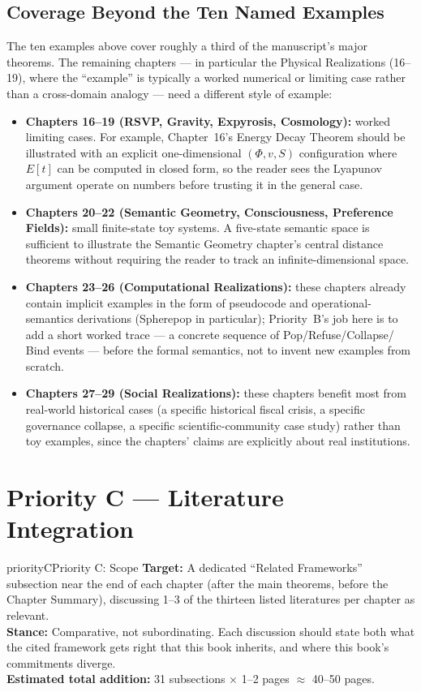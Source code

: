 \documentclass[11pt]{report}
\begin{document}
\section{Coverage Beyond the Ten Named Examples}

The ten examples above cover roughly a third of the
manuscript's major theorems. The remaining chapters --- in
particular the Physical Realizations (16--19), where the
``example'' is typically a worked numerical or limiting case
rather than a cross-domain analogy --- need a different style
of example:

\begin{itemize}
\item \textbf{Chapters 16--19 (RSVP, Gravity, Expyrosis,
  Cosmology):} worked limiting cases. For example, Chapter~16's
  Energy Decay Theorem should be illustrated with an explicit
  one-dimensional $(\Phi, v, S)$ configuration where $E[t]$ can
  be computed in closed form, so the reader sees the Lyapunov
  argument operate on numbers before trusting it in the
  general case.
\item \textbf{Chapters 20--22 (Semantic Geometry, Consciousness,
  Preference Fields):} small finite-state toy systems. A
  five-state semantic space is sufficient to illustrate the
  Semantic Geometry chapter's central distance theorems without
  requiring the reader to track an infinite-dimensional space.
\item \textbf{Chapters 23--26 (Computational Realizations):}
  these chapters already contain implicit examples in the form
  of pseudocode and operational-semantics derivations (Spherepop
  in particular); Priority~B's job here is to add a short
  worked trace --- a concrete sequence of Pop/Refuse/Collapse/
  Bind events --- before the formal semantics, not to invent new
  examples from scratch.
\item \textbf{Chapters 27--29 (Social Realizations):} these
  chapters benefit most from real-world historical cases (a
  specific historical fiscal crisis, a specific governance
  collapse, a specific scientific-community case study) rather
  than toy examples, since the chapters' claims are explicitly
  about real institutions.
\end{itemize}

\chapter{Priority C --- Literature Integration}
\label{ch:priority-c}

\begin{prioritybox}{priorityC}{Priority C: Scope}
\textbf{Target:} A dedicated ``Related Frameworks'' subsection
  near the end of each chapter (after the main theorems, before
  the Chapter Summary), discussing 1--3 of the thirteen listed
  literatures per chapter as relevant.\\
\textbf{Stance:} Comparative, not subordinating. Each
  discussion should state both what the cited framework gets
  right that this book inherits, and where this book's
  commitments diverge.\\
\textbf{Estimated total addition:} 31 subsections
  $\times$ 1--2 pages $\approx$ 40--50 pages.
\end{prioritybox}
\end{document}
